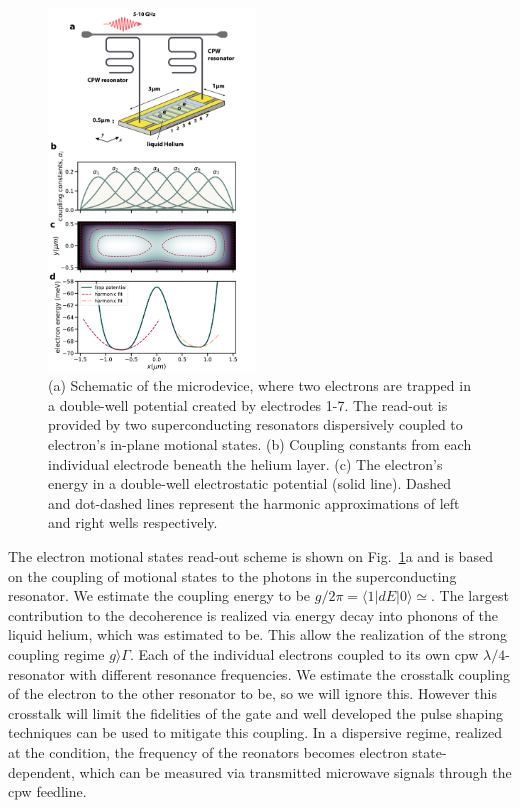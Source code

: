 \documentclass[twocolumn,superscriptaddress,unsortedaddress,
 amsmath,amssymb,
 aps,
]{revtex4-2}
\begin{document}
\begin{figure}
\includegraphics[width=0.49\textwidth]{figure1.pdf}
\caption{\label{fig1} (a) Schematic of the microdevice, where two electrons are trapped in a double-well potential created by electrodes 1-7. The read-out is provided by two superconducting resonators dispersively coupled to  electron's in-plane motional states. (b) Coupling constants from each individual electrode beneath the helium layer. (c) The electron's energy in a  double-well electrostatic potential (solid line). Dashed and dot-dashed lines represent the harmonic approximations of left and right wells respectively.}
\end{figure}

The electron motional states read-out scheme is shown on Fig.~\ref{fig1}a and is based on the coupling of motional states to the photons in the superconducting resonator. We estimate the coupling energy to be $g/2 \pi = \langle 1 | d E| 0 \rangle \simeq $. The largest contribution to the decoherence is realized via energy decay into phonons of the liquid helium, which was estimated to be. This allow the realization of the strong coupling regime $g \rangle \Gamma$. Each of the individual electrons coupled to its own cpw $\lambda/4$-resonator with different resonance frequencies. We estimate the crosstalk coupling of the electron to the other resonator to be, so we will ignore this. However this crosstalk will limit the fidelities of the gate and well developed the pulse shaping techniques can be used to mitigate this coupling. In a dispersive regime, realized at the condition, the frequency of the reonators becomes electron state-dependent, which can be measured via transmitted microwave signals through the cpw feedline.
\end{document}
